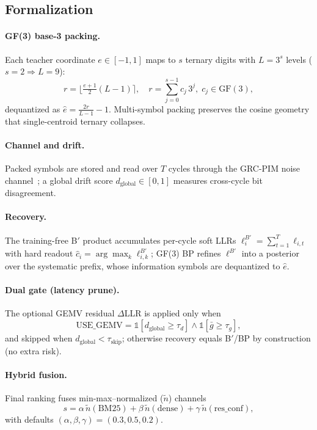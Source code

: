 \documentclass[sigconf,review,anonymous]{acmart}
\begin{document}
\subsection{Formalization}
\paragraph{GF(3) base-3 packing.} Each teacher coordinate $e\in[-1,1]$ maps to $s$ ternary digits with $L=3^{s}$ levels ($s{=}2\Rightarrow L{=}9$):
\begin{equation}
r=\Big\lfloor\tfrac{e+1}{2}(L-1)\Big\rceil,\quad r=\sum_{j=0}^{s-1} c_j\,3^{j},\; c_j\in\mathrm{GF}(3),
\end{equation}
dequantized as $\hat e=\tfrac{2r}{L-1}-1$. Multi-symbol packing preserves the cosine geometry that single-centroid ternary collapses.

\paragraph{Channel and drift.} Packed symbols are stored and read over $T$ cycles through the GRC-PIM noise channel~\cite{grcpim2025}; a global drift score $d_{\mathrm{global}}\in[0,1]$ measures cross-cycle bit disagreement.

\paragraph{Recovery.} The training-free B$'$ product accumulates per-cycle soft LLRs $\ell_i^{B'}=\sum_{t=1}^{T}\ell_{i,t}$ with hard readout $\hat c_i=\arg\max_k \ell_{i,k}^{B'}$; GF(3) BP refines $\ell^{B'}$ into a posterior over the systematic prefix, whose information symbols are dequantized to $\hat e$.

\paragraph{Dual gate (latency prune).} The optional GEMV residual $\Delta$LLR is applied only when
\begin{equation}
\mathrm{USE\_GEMV}=\mathbb{1}[d_{\mathrm{global}}\ge\tau_d]\wedge\mathbb{1}[\bar g\ge\tau_g],
\end{equation}
and skipped when $d_{\mathrm{global}}<\tau_{\mathrm{skip}}$; otherwise recovery equals B$'$/BP by construction (no extra risk).

\paragraph{Hybrid fusion.} Final ranking fuses min-max--normalized ($\tilde n$) channels
\begin{equation}
s = \alpha\,\tilde n(\text{BM25}) + \beta\,\tilde n(\text{dense}) + \gamma\,\tilde n(\text{res\_conf}),
\end{equation}
with defaults $(\alpha,\beta,\gamma)=(0.3,0.5,0.2)$.
\end{document}

